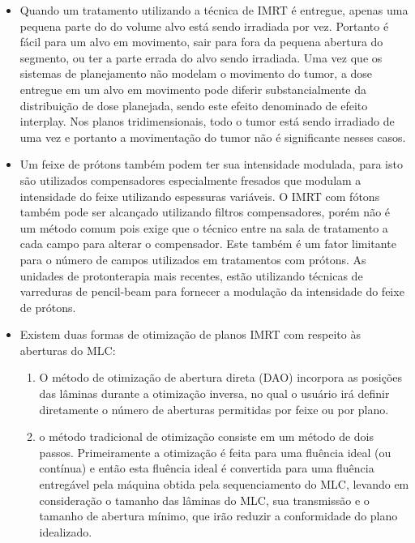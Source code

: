 \documentclass[11pt,a4paper]{article}
\newcounter{exemplo}
\begin{document}
\begin{exemplo}
\begin{itemize}
        \item Quando um tratamento utilizando a técnica de IMRT é entregue, apenas uma pequena parte do do volume alvo está sendo irradiada por vez. Portanto é fácil para um alvo em movimento, sair para fora da pequena abertura do segmento, ou ter a parte errada do alvo sendo irradiada. Uma vez que os sistemas de planejamento não modelam o movimento do tumor, a dose entregue em um alvo em movimento pode diferir substancialmente da distribuição de dose planejada, sendo este efeito denominado de \textcolor{CarnationPink}{efeito interplay}. Nos planos tridimensionais, todo o tumor está sendo irradiado de uma vez e portanto a movimentação do tumor não é significante nesses casos.
        
        \item Um feixe de prótons também podem ter sua intensidade modulada, para isto são utilizados compensadores especialmente fresados que modulam a intensidade do feixe utilizando espessuras variáveis. O IMRT com fótons também pode ser alcançado utilizando filtros compensadores, porém não é um método comum pois exige que o técnico entre na sala de tratamento a cada campo para alterar o compensador. Este também é um fator limitante para o número de campos utilizados em tratamentos com prótons. As unidades de protonterapia mais recentes, estão utilizando técnicas de varreduras de pencil-beam para fornecer a modulação da intensidade do feixe de prótons.
        
        \item Existem duas formas de otimização de planos IMRT com respeito às aberturas do MLC:
        
            \begin{enumerate}[label=\textcolor{CarnationPink}{\roman*.}]
                \item O método de otimização de abertura direta (DAO) incorpora as posições das lâminas durante a otimização inversa, no qual o usuário irá definir diretamente o número de aberturas permitidas por feixe ou por plano.
                
                \item o método tradicional de otimização consiste em um método de dois passos. Primeiramente a otimização é feita para uma fluência ideal (ou contínua) e então esta fluência ideal é convertida para uma fluência entregável pela máquina obtida pela sequenciamento do MLC, levando em consideração o tamanho das lâminas do MLC, sua transmissão e o tamanho de abertura mínimo, que irão reduzir a conformidade do plano idealizado.
            \end{enumerate}


\end{itemize}
\end{exemplo}
\end{document}
